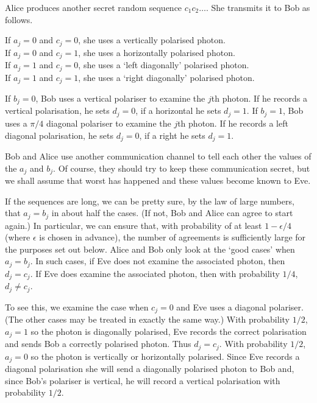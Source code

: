  Alice produces another
secret
random sequence $c_{1}c_{2}\dots$.
She transmits it to Bob as follows.
\begin{center}
If $a_{j}=0$ and $c_{j}=0$, she uses a vertically polarised photon.\\
If $a_{j}=0$ and $c_{j}=1$, she uses a horizontally polarised photon.\\
If $a_{j}=1$ and $c_{j}=0$, she uses a `left diagonally' polarised photon.\\
If $a_{j}=1$ and $c_{j}=1$, she uses a `right diagonally' polarised photon.
\end{center}

 If $b_{j}=0$, Bob uses a vertical polariser
to examine the $j$th photon. If he records a vertical polarisation,
he sets  $d_{j}=0$, if a horizontal he sets $d_{j}=1$.
If $b_{j}=1$, Bob uses a $\pi/4$ diagonal  polariser
to examine the $j$th photon. If he records a left diagonal polarisation,
he sets  $d_{j}=0$, if a right he sets $d_{j}=1$.

 Bob and Alice use another communication
channel to tell each other the values of the $a_{j}$ and
$b_{j}$. Of course, they should try to keep these communication
secret, but we shall assume that worst has happened and
these values become known to Eve.

 If the sequences are long, we can be pretty sure,
by the law of large numbers, that $a_{j}=b_{j}$ in about half the cases.
(If not, Bob and Alice can agree to start again.)  
In particular,  we can ensure that, with probability of at least 
$1-\epsilon/4$ (where $\epsilon$ is chosen in advance), 
the number of agreements is sufficiently
large for the purposes set out below.
Alice
and Bob only look at the `good cases' when $a_{j}=b_{j}$.
In such cases, if Eve does not examine the associated photon,
then $d_{j}=c_{j}$. If Eve does examine the associated photon,
then with probability $1/4$, $d_{j}\neq c_{j}$.

To see this, we examine the case when $c_{j}=0$ and
Eve uses a diagonal polariser. (The other cases
may be treated in exactly the same way.)
With probability $1/2$, $a_{j}=1$ so the photon is diagonally
polarised, Eve records the correct polarisation
and sends Bob a correctly polarised photon. Thus $d_{j}=c_{j}$.
With probability $1/2$, $a_{j}=0$ so the photon is vertically
or horizontally polarised. Since Eve records a diagonal polarisation
she will send a diagonally polarised photon to Bob  
and, since Bob's polariser is vertical, he will
record a vertical polarisation
with probability $1/2$.  
  
